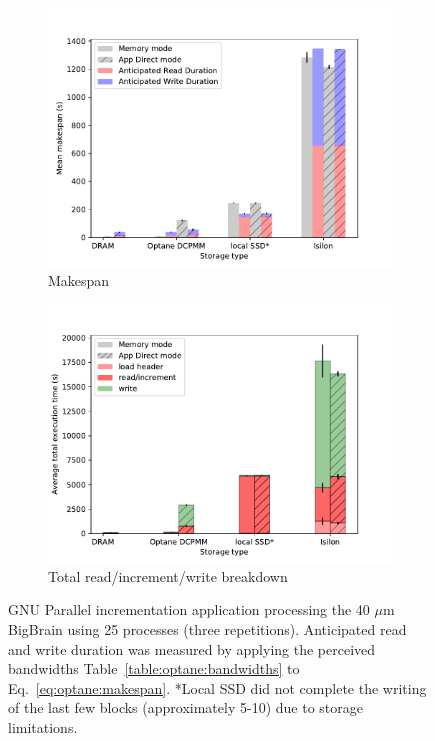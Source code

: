 \begin{figure}
    \begin{subfigure}{0.5\textwidth}
        \centering
        \includegraphics[width=\columnwidth]{figures/optane/makespan-real-40bb_25cpus.pdf}
        \caption{Makespan}\label{fig:optane:makespan-25cpus}
    \end{subfigure}
    \begin{subfigure}{0.5\textwidth}
        \centering
        \includegraphics[width=\columnwidth]{figures/optane/stacked-real-40bb_25cpus.pdf}
        \caption{Total read/increment/write breakdown}\label{fig:optane:stacked-25cpus}
    \end{subfigure}
    \captionsetup{belowskip=-10pt}
    \caption{GNU Parallel incrementation application processing the 40 $\mu$m
    BigBrain using 25 processes (three repetitions). Anticipated read and write
    duration was measured by applying the perceived bandwidths
    Table~\ref{table:optane:bandwidths} to Eq.~\ref{eq:optane:makespan}. *Local SSD did not
    complete the writing of the last few blocks (approximately 5-10) due to
    storage limitations.}
\end{figure}

